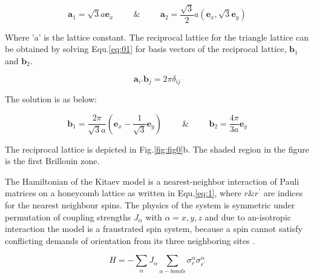 \documentclass{article}
\begin{document}
\begin{equation}\label{eq:0}
    \textbf{a}_1 = \sqrt{3} a \textbf{e}_x \hspace{1cm} \& \hspace{1cm}
    \textbf{a}_2 = \frac{\sqrt{3}}{2} a (\textbf{e}_x, \sqrt{3}\textbf{e}_y)
\end{equation}

Where 'a' is the lattice constant. The reciprocal lattice for the triangle lattice can be obtained by solving Equ.\hspace{0.2mm}\ref{eq:01} for basis vectors of the reciprocal lattice, $\textbf{b}_1$ and $\textbf{b}_2$.

\begin{equation}\label{eq:01}
    \textbf{a}_i.\textbf{b}_j = 2\pi\delta_{ij}
\end{equation}

The solution is as below:

\begin{equation}\label{eq:02}
    \textbf{b}_1 = \frac{2\pi}{\sqrt{3}a} (\textbf{e}_x-\frac{1}{\sqrt{3}}\textbf{e}_y) \hspace{1cm} \& \hspace{1cm}
    \textbf{b}_2 = \frac{4\pi}{3a} \textbf{e}_y
\end{equation}

The reciprocal lattice is depicted in Fig.\hspace{0.2mm}\ref{fig:fig0}b. The shaded region in the figure is the first Brillouin zone.

The Hamiltonian of the Kitaev model is a nearest-neighbor interaction of Pauli matrices on a honeycomb lattice as written in Equ.\hspace{0.2mm}\ref{eq:1}, where $r \& r^{'}$ are indices for the nearest neighbour spins. The physics of the system is symmetric under permutation of coupling strengths $J_{\alpha}$ with $\alpha = x, y, z$ and due to an-isotropic interaction the model is a fraustrated spin system, because a spin cannot satisfy conflicting
 demands of orientation from its three neighboring sites \cite{kita}.

\begin{equation}\label{eq:1}
    H = - \sum_{\alpha} J_{\alpha} \sum_{\alpha-bonds} \sigma^{\alpha}_{r}\sigma^{\alpha}_{r^{'}}
\end{equation}
\end{document}
